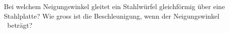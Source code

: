 Bei welchem Neigungswinkel gleitet ein Stahlwürfel gleichförmig über eine Stahlplatte? Wie gross ist die Beschleunigung, wenn der Neigungswinkel \wiBO\ beträgt?

